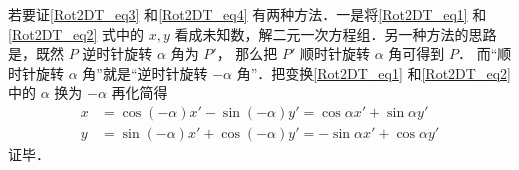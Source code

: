 若要证\autoref{Rot2DT_eq3} 和\autoref{Rot2DT_eq4} 有两种方法．一是将\autoref{Rot2DT_eq1} 和\autoref{Rot2DT_eq2} 式中的 $x, y$ 看成未知数，解二元一次方程组．另一种方法的思路是，既然 $P$ 逆时针旋转 $\alpha $ 角为 $P'$， 那么把 $P'$ 顺时针旋转 $\alpha$ 角可得到 $P$． 而“顺时针旋转 $\alpha$ 角”就是“逆时针旋转 $-\alpha $ 角”．把变换\autoref{Rot2DT_eq1} 和\autoref{Rot2DT_eq2} 中的 $\alpha$ 换为 $-\alpha$ 再化简得
 \begin{align}
x &= \cos(-\alpha) x' - \sin(-\alpha) y' = \cos\alpha x' + \sin\alpha y'\\
y &= \sin(-\alpha) x' + \cos(-\alpha) y' =  -\sin\alpha x' + \cos\alpha y'
\end{align}
证毕．
